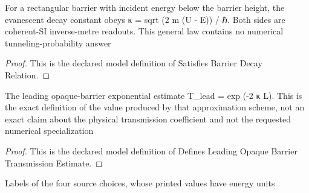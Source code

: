 \begin{definition}
  \label{def:physics:phyx-mini-0616:phyxminiproblems-problemphyxmini0616-satisfiesbarrierdecayrelation}
  For a rectangular barrier with incident energy below the barrier height, the evanescent decay constant obeys κ = sqrt (2 m (U - E)) / ℏ. Both sides are coherent-SI inverse-metre readouts. This general law contains no numerical tunneling-probability answer
\end{definition}
\begin{proof}
  This is the declared model definition of Satisfies Barrier Decay Relation.
\end{proof}
\begin{definition}
  \label{def:physics:phyx-mini-0616:phyxminiproblems-problemphyxmini0616-definesleadingopaquebarriertransmissionestimate}
  The leading opaque-barrier exponential estimate T\_lead = exp (-2 κ L). This is the exact definition of the value produced by that approximation scheme, not an exact claim about the physical transmission coefficient and not the requested numerical specialization
\end{definition}
\begin{proof}
  This is the declared model definition of Defines Leading Opaque Barrier Transmission Estimate.
\end{proof}
\begin{definition}
  \label{def:physics:phyx-mini-0616:phyxminiproblems-problemphyxmini0616-malformedsourcechoice}
  Labels of the four source choices, whose printed values have energy units
\end{definition}
